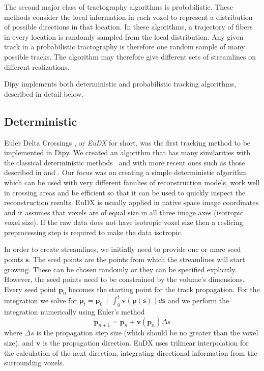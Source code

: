 \documentclass{bioinfo}
\begin{document}
The second major class of tractography algorithms is probabilistic. These
methods consider the local
information in each voxel to represent a distribution of possible directions in
that location. In these algorithms, a trajectory of fibers in every location is
randomly sampled from the local distribution. Any given track in a probabilistic
tractography is therefore one random sample of many possible tracks.  The
algorithm may therefore give different sets of streamlines on different
realizations.

Dipy implements both deterministic and probabilistic tracking algorithms,
described in detail below.

\subsection{Deterministic}
Euler Delta Crossings \citep{Garyfallidis_thesis}, or \emph{EuDX} for short, was the first tracking
method to be implemented in Dipy. We created an algorithm that has many
similarities with the classical deterministic methods~\citep{Mori1999,
  conturo-lori-etal:99, basser-pajevic-etal:00} and with more recent ones such as
those described in \citet{descoteaux-deriche-etal:09} and
\citet{yeh-etal:10}. Our focus was on creating a simple
deterministic algorithm which can be used with very different families of
reconstruction models, work well in crossing areas and be efficient so that it
can be used to quickly inspect the reconstruction results. EuDX is usually applied
in native space image coordinates and it assumes that voxels are of equal size
in all three image axes (isotropic voxel size). If the raw data does not have
isotropic voxel size then a reslicing preprocessing step is
required to make the data isotropic.

In order to create streamlines, we initially need to provide one or more seed
points $\mathbf{s}$. The seed points are the points from which the streamlines will start growing. These can
be chosen randomly or they can be specified explicitly. However, the seed
points need to be constrained by the volume's dimensions. Every seed point
$\mathbf{p}_{0}$ becomes the starting point for the track propagation. For the
integration we solve for
$\mathbf{p}_{t}=\mathbf{p}_{0}+\int_{0}^{t}\mathbf{v}(\mathbf{p}(\mathbf{s}))d\mathbf{s}$
and we perform the integration numerically using Euler's method
\begin{equation}
\mathbf{p}_{n+1}=\mathbf{p}_{n}+\mathbf{v}(\mathbf{p}_{n})\Delta s\label{eq:euler}
\end{equation}
\noindent where $\Delta s$ is the propagation step size (which should be no
greater than the voxel size), and $\mathbf{v}$ is the propagation
direction. EuDX uses trilinear interpolation for the calculation
of the next direction, integrating directional information from the surrounding
voxels.
\end{document}
